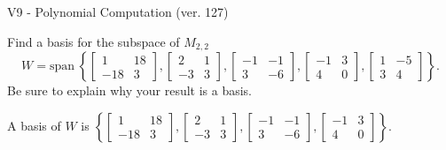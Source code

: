 \begin{exercise}
  \begin{exerciseTitle}V9 - Polynomial Computation (ver. 127)\end{exerciseTitle}
  \begin{exerciseStatement}
    Find a basis for the subspace of \(M_{2,2}\) 
\[W=\mathrm{span}\ \left\{\left[\begin{array}{cc}
1 & 18 \\
-18 & 3
\end{array}\right] , \left[\begin{array}{cc}
2 & 1 \\
-3 & 3
\end{array}\right] , \left[\begin{array}{cc}
-1 & -1 \\
3 & -6
\end{array}\right] , \left[\begin{array}{cc}
-1 & 3 \\
4 & 0
\end{array}\right] , \left[\begin{array}{cc}
1 & -5 \\
3 & 4
\end{array}\right]\right\}.\]
 Be sure to explain why your result is a basis.


  \end{exerciseStatement}
  \begin{exerciseAnswer}
   A basis of \(W\) is  \(\left\{\left[\begin{array}{cc}
1 & 18 \\
-18 & 3
\end{array}\right] , \left[\begin{array}{cc}
2 & 1 \\
-3 & 3
\end{array}\right] , \left[\begin{array}{cc}
-1 & -1 \\
3 & -6
\end{array}\right] , \left[\begin{array}{cc}
-1 & 3 \\
4 & 0
\end{array}\right]\right\}\).
  


  \end{exerciseAnswer}
\end{exercise}